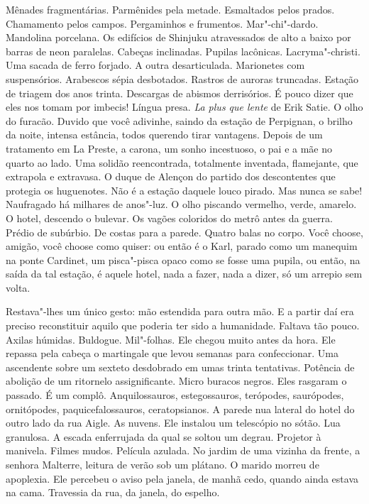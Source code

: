 Mênades fragmentárias. Parmênides pela metade. Esmaltados pelos prados.
Chamamento pelos campos. Pergaminhos e frumentos. Mar"-chi"-dardo.
Mandolina porcelana. Os edifícios de Shinjuku atravessados de alto a
baixo por barras de neon paralelas. Cabeças inclinadas. Pupilas
lacônicas. Lacryma"-christi. Uma sacada de ferro forjado. A outra
desarticulada. Marionetes com suspensórios. Arabescos sépia desbotados.
Rastros de auroras truncadas. Estação de triagem dos anos trinta.
Descargas de abismos derrisórios. É pouco dizer que eles nos tomam por
imbecis! Língua presa. \emph{La plus que lente} de Erik Satie. O olho do
furacão. Duvido que você adivinhe, saindo da estação de Perpignan, o
brilho da noite, intensa estância, todos querendo tirar vantagens.
Depois de um tratamento em La Preste, a carona, um sonho incestuoso, o
pai e a mãe no quarto ao lado. Uma solidão reencontrada, totalmente
inventada, flamejante, que extrapola e extravasa. O duque de Alençon do
partido dos descontentes que protegia os huguenotes. Não é a estação
daquele louco pirado. Mas nunca se sabe! Naufragado há milhares de
anos"-luz. O olho piscando vermelho, verde, amarelo. O hotel, descendo o
bulevar. Os vagões coloridos do metrô antes da guerra. Prédio de
subúrbio. De costas para a parede. Quatro balas no corpo. Você choose,
amigão, você choose como quiser: ou então é o Karl, parado como um
manequim na ponte Cardinet, um pisca"-pisca opaco como se fosse uma
pupila, ou então, na saída da tal estação, é aquele hotel, nada a fazer,
nada a dizer, só um arrepio sem volta.

Restava"-lhes um único gesto: mão estendida para outra mão. E a partir
daí era preciso reconstituir aquilo que poderia ter sido a humanidade.
Faltava tão pouco. Axilas húmidas. Buldogue. Mil"-folhas. Ele chegou %
muito antes da hora. Ele repassa pela cabeça o martingale que levou
semanas para confeccionar. Uma ascendente sobre um sexteto desdobrado em
umas trinta tentativas. Potência de abolição de um ritornelo
assignificante. Micro buracos negros. Eles rasgaram o passado. É um
complô. Anquilossauros, estegossauros, terópodes, saurópodes,
ornitópodes, paquicefalossauros, ceratopsianos. A parede nua lateral do
hotel do outro lado da rua Aigle. As nuvens. Ele instalou um telescópio
no sótão. Lua granulosa. A escada enferrujada da qual se soltou um
degrau. Projetor à manivela. Filmes mudos. Película azulada. No jardim
de uma vizinha da frente, a senhora Malterre, leitura de verão sob um
plátano. O marido morreu de apoplexia. Ele percebeu o aviso pela janela,
de manhã cedo, quando ainda estava na cama. Travessia da rua, da janela,
do espelho.

